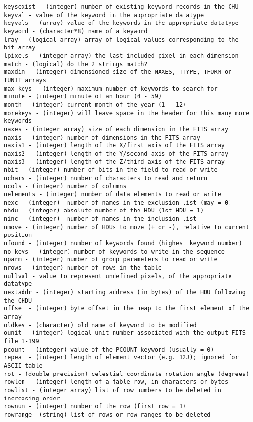 \documentclass[11pt]{book}
\begin{document}
\begin{verbatim}
keysexist - (integer) number of existing keyword records in the CHU
keyval - value of the keyword in the appropriate datatype
keyvals - (array) value of the keywords in the appropriate datatype
keyword - (character*8) name of a keyword
lray - (logical array) array of logical values corresponding to the bit array
lpixels - (integer array) the last included pixel in each dimension
match - (logical) do the 2 strings match?
maxdim - (integer) dimensioned size of the NAXES, TTYPE, TFORM or TUNIT arrays
max_keys - (integer) maximum number of keywords to search for
minute - (integer) minute of an hour (0 - 59)
month - (integer) current month of the year (1 - 12)
morekeys - (integer) will leave space in the header for this many more keywords
naxes - (integer array) size of each dimension in the FITS array
naxis - (integer) number of dimensions in the FITS array
naxis1 - (integer) length of the X/first axis of the FITS array
naxis2 - (integer) length of the Y/second axis of the FITS array
naxis3 - (integer) length of the Z/third axis of the FITS array
nbit - (integer) number of bits in the field to read or write
nchars - (integer) number of characters to read and return
ncols - (integer) number of columns
nelements - (integer) number of data elements to read or write
nexc   (integer)  number of names in the exclusion list (may = 0)
nhdu - (integer) absolute number of the HDU (1st HDU = 1)
ninc   (integer)  number of names in the inclusion list
nmove - (integer) number of HDUs to move (+ or -), relative to current position
nfound - (integer) number of keywords found (highest keyword number)
no_keys - (integer) number of keywords to write in the sequence
nparm - (integer) number of group parameters to read or write
nrows - (integer) number of rows in the table
nullval - value to represent undefined pixels, of the appropriate datatype
nextaddr - (integer) starting address (in bytes) of the HDU following the CHDU
offset - (integer) byte offset in the heap to the first element of the array
oldkey - (character) old name of keyword to be modified
ounit - (integer) logical unit number associated with the output FITS file 1-199
pcount - (integer) value of the PCOUNT keyword (usually = 0)
repeat - (integer) length of element vector (e.g. 12J); ignored for ASCII table
rot - (double precision) celestial coordinate rotation angle (degrees)
rowlen - (integer) length of a table row, in characters or bytes
rowlist - (integer array) list of row numbers to be deleted in increasing order
rownum - (integer) number of the row (first row = 1)
rowrange- (string) list of rows or row ranges to be deleted

\end{verbatim}
\end{document}
